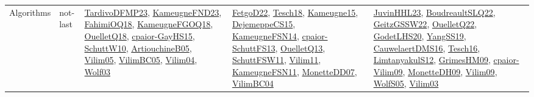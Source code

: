 {\begin{longtable}{lp{3cm}>{\raggedright}p{6cm}>{\raggedright}p{6cm}p{8cm}}
Algorithms & not-last & \href{papers/TardivoDFMP23.pdf}{TardivoDFMP23}\cite{TardivoDFMP23}, \href{papers/KameugneFND23.pdf}{KameugneFND23}\cite{KameugneFND23}, \href{articles/FahimiOQ18.pdf}{FahimiOQ18}\cite{FahimiOQ18}, \href{papers/KameugneFGOQ18.pdf}{KameugneFGOQ18}\cite{KameugneFGOQ18}, \href{papers/OuelletQ18.pdf}{OuelletQ18}\cite{OuelletQ18}, \href{papers/cpaior-GayHS15.pdf}{cpaior-GayHS15}\cite{cpaior-GayHS15}, \href{papers/SchuttW10.pdf}{SchuttW10}\cite{SchuttW10}, \href{papers/ArtiouchineB05.pdf}{ArtiouchineB05}\cite{ArtiouchineB05}, \href{papers/Vilim05.pdf}{Vilim05}\cite{Vilim05}, \href{articles/VilimBC05.pdf}{VilimBC05}\cite{VilimBC05}, \href{papers/Vilim04.pdf}{Vilim04}\cite{Vilim04}, \href{papers/Wolf03.pdf}{Wolf03}\cite{Wolf03} & \href{articles/FetgoD22.pdf}{FetgoD22}\cite{FetgoD22}, \href{papers/Tesch18.pdf}{Tesch18}\cite{Tesch18}, \href{articles/Kameugne15.pdf}{Kameugne15}\cite{Kameugne15}, \href{papers/DejemeppeCS15.pdf}{DejemeppeCS15}\cite{DejemeppeCS15}, \href{articles/KameugneFSN14.pdf}{KameugneFSN14}\cite{KameugneFSN14}, \href{papers/cpaior-SchuttFS13.pdf}{cpaior-SchuttFS13}\cite{cpaior-SchuttFS13}, \href{papers/OuelletQ13.pdf}{OuelletQ13}\cite{OuelletQ13}, \href{articles/SchuttFSW11.pdf}{SchuttFSW11}\cite{SchuttFSW11}, \href{papers/Vilim11.pdf}{Vilim11}\cite{Vilim11}, \href{papers/KameugneFSN11.pdf}{KameugneFSN11}\cite{KameugneFSN11}, \href{papers/MonetteDD07.pdf}{MonetteDD07}\cite{MonetteDD07}, \href{papers/VilimBC04.pdf}{VilimBC04}\cite{VilimBC04} & \href{papers/JuvinHHL23.pdf}{JuvinHHL23}\cite{JuvinHHL23}, \href{papers/BoudreaultSLQ22.pdf}{BoudreaultSLQ22}\cite{BoudreaultSLQ22}, \href{papers/GeitzGSSW22.pdf}{GeitzGSSW22}\cite{GeitzGSSW22}, \href{papers/OuelletQ22.pdf}{OuelletQ22}\cite{OuelletQ22}, \href{papers/GodetLHS20.pdf}{GodetLHS20}\cite{GodetLHS20}, \href{papers/YangSS19.pdf}{YangSS19}\cite{YangSS19}, \href{papers/CauwelaertDMS16.pdf}{CauwelaertDMS16}\cite{CauwelaertDMS16}, \href{papers/Tesch16.pdf}{Tesch16}\cite{Tesch16}, \href{articles/LimtanyakulS12.pdf}{LimtanyakulS12}\cite{LimtanyakulS12}, \href{papers/GrimesHM09.pdf}{GrimesHM09}\cite{GrimesHM09}, \href{papers/cpaior-Vilim09.pdf}{cpaior-Vilim09}\cite{cpaior-Vilim09}, \href{papers/MonetteDH09.pdf}{MonetteDH09}\cite{MonetteDH09}, \href{papers/Vilim09.pdf}{Vilim09}\cite{Vilim09}, \href{papers/WolfS05.pdf}{WolfS05}\cite{WolfS05}, \href{papers/Vilim03.pdf}{Vilim03}\cite{Vilim03}\\

\end{longtable}}
